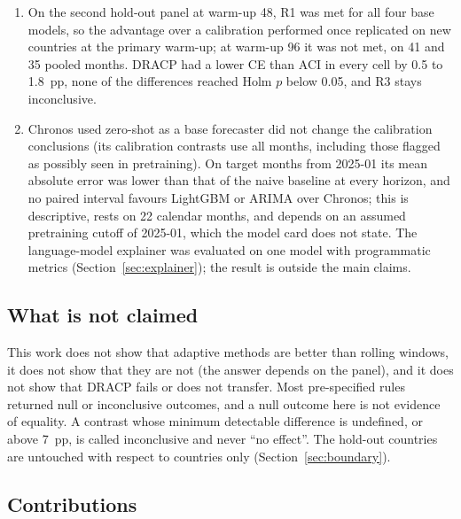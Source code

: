\begin{enumerate}
\item On the second hold-out panel at warm-up 48, R1 was met for all four base models, so the advantage over a calibration performed once replicated on new countries at the primary warm-up; at warm-up 96 it was not met, on 41 and 35 pooled months. DRACP had a lower CE than ACI in every cell by 0.5 to 1.8~pp, none of the differences reached Holm $p$ below 0.05, and R3 stays inconclusive.
\item Chronos used zero-shot as a base forecaster did not change the calibration conclusions (its calibration contrasts use all months, including those flagged as possibly seen in pretraining). On target months from 2025-01 its mean absolute error was lower than that of the naive baseline at every horizon, and no paired interval favours LightGBM or ARIMA over Chronos; this is descriptive, rests on 22 calendar months, and depends on an assumed pretraining cutoff of 2025-01, which the model card does not state. The language-model explainer was evaluated on one model with programmatic metrics (Section~\ref{sec:explainer}); the result is outside the main claims.
\end{enumerate}

\subsection{What is not claimed}

This work does not show that adaptive methods are better than rolling windows, it does not show that they are not (the answer depends on the panel), and it does not show that DRACP fails or does not transfer. Most pre-specified rules returned null or inconclusive outcomes, and a null outcome here is not evidence of equality. A contrast whose minimum detectable difference is undefined, or above 7~pp, is called inconclusive and never ``no effect''. The hold-out countries are untouched with respect to countries only (Section~\ref{sec:boundary}).

\subsection{Contributions}

